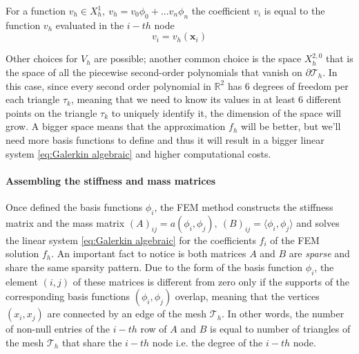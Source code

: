 \vspace{0.5cm}
\begin{remark}
	For a function $v_h \in X^1_h,\ v_h = v_0 \phi_0 +...  v_n \phi_n$ the coefficient $v_i$ is equal to the function $v_h$ evaluated in the $i-th$ node 
	\begin{equation}\label{eq:dof and values}
		v_i = v_h(\mathbf x_i)
	\end{equation}
\end{remark}\vspace{0.5cm}

Other choices for $V_h$ are possible; another common choice is the space $X_h^{2,0}$ that is the space of all the piecewise second-order polynomials that vanish on $\partial \mathcal T_h$. In this case, since every second order polynomial in $\mathbb R^2$ has 6 degrees of freedom per each triangle $\tau_k$, meaning that we need to know its values in at least 6 different points on the triangle $\tau_k$ to uniquely identify it, the dimension of the space will grow. A bigger space means that the approximation $f_h$ will be better, but we'll need more basis functions to define and thus it will result in a bigger linear system \ref{eq:Galerkin algebraic} and higher computational costs.

\paragraph{Assembling the stiffness and mass matrices}
Once defined the basis functions $\phi_i$, the FEM method constructs the stiffness matrix and the mass matrix $(A)_{ij} = a(\phi_i, \phi_j),\  (B)_{ij}=\langle\phi_i,\phi_j\rangle$ and solves the linear system \ref{eq:Galerkin algebraic} for the coefficients $f_i$ of the FEM solution $f_h$. An important fact to notice is both matrices $A$ and $B$ are \textit{sparse} and share the same sparsity pattern. Due to the form of the basis function $\phi_i$, the element $(i, j)$ of these matrices is different from zero only if the supports of the corresponding basis functions $(\phi_i, \phi_j)$ overlap, meaning that the vertices $(x_i, x_j)$ are connected by an edge of the mesh $\mathcal T_h$. In other words, the number of non-null entries of the $i-th$ row of $A$ and $B$ is equal to number of triangles of the mesh $\mathcal T_h$ that share the $i-th$ node i.e. the degree of the $i-th$ node.

